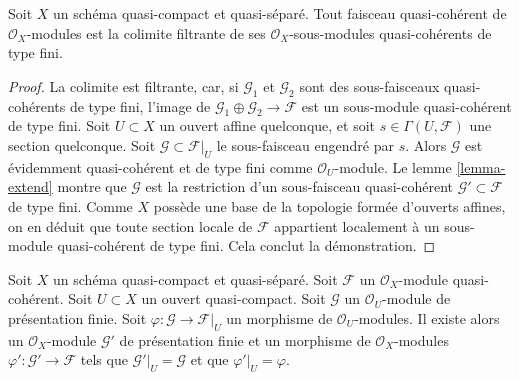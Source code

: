 \begin{lemma}
\label{lemma-quasi-coherent-colimit-finite-type}
Soit $X$ un schéma quasi-compact et quasi-séparé. Tout
faisceau quasi-cohérent de $\mathcal{O}_X$-modules
est la colimite filtrante de ses
$\mathcal{O}_X$-sous-modules quasi-cohérents de type fini.
\end{lemma}

\begin{proof}
La colimite est filtrante, car, si $\mathcal{G}_1$ et $\mathcal{G}_2$
sont des sous-faisceaux quasi-cohérents de type fini, l'image de
$\mathcal{G}_1 \oplus \mathcal{G}_2 \to \mathcal{F}$ est
un sous-module quasi-cohérent de type fini.
Soit $U \subset X$ un ouvert affine quelconque, et soit
$s \in \Gamma(U, \mathcal{F})$ une section quelconque.
Soit $\mathcal{G} \subset \mathcal{F}|_U$ le
sous-faisceau engendré par $s$. Alors $\mathcal{G}$
est évidemment quasi-cohérent et de type fini comme $\mathcal{O}_U$-module.
Le lemme \ref{lemma-extend} montre que $\mathcal{G}$ est la restriction
d'un sous-faisceau quasi-cohérent $\mathcal{G}' \subset \mathcal{F}$
de type fini. Comme $X$ possède une base de la topologie formée
d'ouverts affines, on en déduit que toute section locale de
$\mathcal{F}$ appartient localement à un sous-module quasi-cohérent de type
fini. Cela conclut la démonstration.
\end{proof}

\begin{lemma}
\label{lemma-extend-finite-presentation}
Soit $X$ un schéma quasi-compact et quasi-séparé.
Soit $\mathcal{F}$ un $\mathcal{O}_X$-module
quasi-cohérent. Soit $U \subset X$ un ouvert quasi-compact.
Soit $\mathcal{G}$ un $\mathcal{O}_U$-module de présentation finie.
Soit $\varphi : \mathcal{G} \to \mathcal{F}|_U$ un morphisme de
$\mathcal{O}_U$-modules.
Il existe alors un $\mathcal{O}_X$-module
$\mathcal{G}'$ de présentation finie et un morphisme
de $\mathcal{O}_X$-modules $\varphi' : \mathcal{G}' \to \mathcal{F}$
tels que $\mathcal{G}'|_U = \mathcal{G}$ et que
$\varphi'|_U = \varphi$.
\end{lemma}

